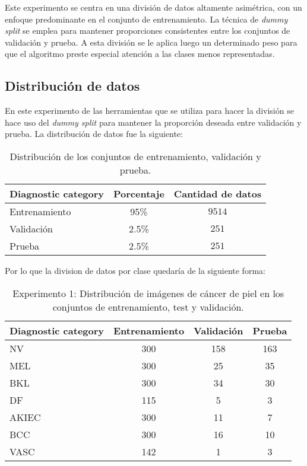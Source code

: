 Este experimento se centra en una división de datos altamente asimétrica, con un enfoque predominante en el conjunto de entrenamiento. La técnica de \textit{dummy split} se emplea para mantener proporciones consistentes entre los conjuntos de validación y prueba. A esta división se le aplica luego un determinado peso para que el algoritmo preste especial atención a las clases menos representadas.

\subsection{Distribución de datos}

En este experimento de las herramientas que se utiliza para hacer la división se hace uso del \textit{dummy split}  para mantener la proporción deseada entre validación y prueba. La distribución de datos fue la siguiente:

\begin{table}[ht]
   \centering
   \begin{tabular}{lcc}
   \hline
   \textbf{Diagnostic category} & \textbf{Porcentaje} & \textbf{Cantidad de datos} \\
   \hline
   Entrenamiento       & 95\% & $9514$ \\
   Validación      & 2.5\% & $251$  \\
   Prueba      & 2.5\% & $251$  \\ \hline
   \end{tabular}
   \caption{Distribución de los conjuntos de entrenamiento, validación y prueba.}
   \label{table:data_distribution_e1}
   \end{table}

   Por lo que la division de datos por clase quedaría de la siguiente forma:

   \begin{table}[ht]
      \centering
      \begin{tabular}{lccc}
      \hline
      \textbf{Diagnostic category} & \textbf{Entrenamiento} & \textbf{Validación} & \textbf{Prueba} \\
      \hline
      NV       & 300 & 158 & 163 \\
      MEL      & 300 & 25  & 35  \\
      BKL      & 300 & 34  & 30  \\
      DF       & 115 & 5   & 3   \\
      AKIEC    & 300 & 11  & 7   \\
      BCC      & 300 & 16  & 10  \\
      VASC     & 142 & 1   & 3   \\ \hline
      \end{tabular}
      \caption{Experimento 1: Distribución de imágenes de cáncer de piel en los conjuntos de entrenamiento, test y validación.}
      \label{table:train_test_validate_e1}
      \end{table}
   
